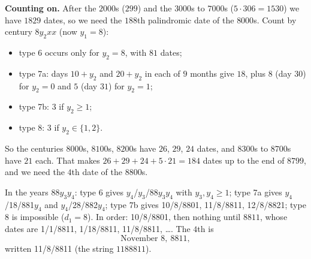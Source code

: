 \textbf{Counting on.} After the $2000$s ($299$) and the $3000$s to $7000$s ($5\cdot306=1530$) we have $1829$ dates, so we need the $188$th palindromic date of the $8000$s. Count by century $8y_2xx$ (now $y_1=8$):
\begin{itemize}
\item type 6 occurs only for $y_2=8$, with $81$ dates;
\item type 7a: days $10+y_2$ and $20+y_2$ in each of $9$ months give $18$, plus $8$ (day $30$) for $y_2=0$ and $5$ (day $31$) for $y_2=1$;
\item type 7b: $3$ if $y_2\ge1$;
\item type 8: $3$ if $y_2\in\{1,2\}$.
\end{itemize}
So the centuries $8000$s, $8100$s, $8200$s have $26$, $29$, $24$ dates, and $8300$s to $8700$s have $21$ each. That makes $26+29+24+5\cdot21=184$ dates up to the end of $8799$, and we need the $4$th date of the $8800$s.

In the years $88y_3y_4$: type 6 gives $y_4$/$y_3$/88$y_3y_4$ with $y_3,y_4\ge1$; type 7a gives $y_4$/18/881$y_4$ and $y_4$/28/882$y_4$; type 7b gives 10/8/8801, 11/8/8811, 12/8/8821; type 8 is impossible ($d_1=8$). In order: 10/8/8801, then nothing until $8811$, whose dates are 1/1/8811, 1/18/8811, 11/8/8811, \dots. The $4$th is
\[
\boxed{\text{November }8,\ 8811},
\]
written 11/8/8811 (the string $1188811$).
